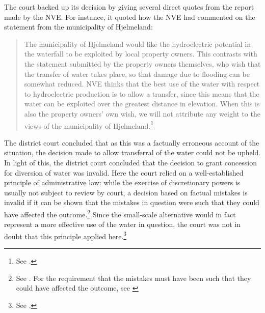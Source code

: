 The court backed up its decision by giving several direct quotes from the report made by the NVE. For instance, it quoted how the NVE had commented on the statement from the municipality of Hjelmeland:
\begin{quote}
The municipality of Hjelmeland would like the hydroelectric potential in the waterfall to be exploited by local property owners. This contrasts with the statement submitted by the property owners 
themselves, who wish that the transfer of water takes place, so that damage due to flooding can be 
somewhat reduced. NVE thinks that the best use of the water with respect to hydroelectric 
production is to allow a transfer, since this means that the water can be exploited over the greatest
distance in elevation. When this is also the property owners' own wish, we will not attribute any 
weight to the views of the municipality of Hjelmeland.\footnote{See \cite[12]{jorpeland09}.}
\end{quote}

The district court concluded that as this was a factually erroneous account of the situation, the decision made to allow transferral of the water could not be upheld. In light of this, the district court concluded that the decision to grant concession for diversion of water was invalid. Here the court relied on a well-established principle of administrative law: while the exercise of discretionary powers is usually not subject to review by court, a decision based on factual mistakes is invalid if it can be shown that the mistakes in question were such that they could have affected the outcome.\footnote{See \cite[407-410]{eckhoff14}. For the requirement that the mistakes must have been such that they could have affected the outcome, see \cite[41]{paa67}} Since the small-scale alternative would in fact represent a more effective use of the water in question, the court was not in doubt that this principle applied here.\footnote{See \cite[25]{jorpeland09}.}

